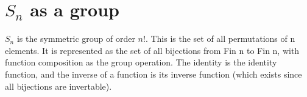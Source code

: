 \section{$S_n$ as a group}

\begin{definition}[$S_n$]
    \label{definition : Sn}
    \leanok
    $S_n$ is the symmetric group of order $n!$. This is the set of all
    permutations of n elements. It is represented as the set of all bijections
    from Fin n to Fin n, with function composition as the group operation. The
    identity is the identity function, and the inverse of a function is its
    inverse function (which exists since all bijections are invertable).
\end{definition}

